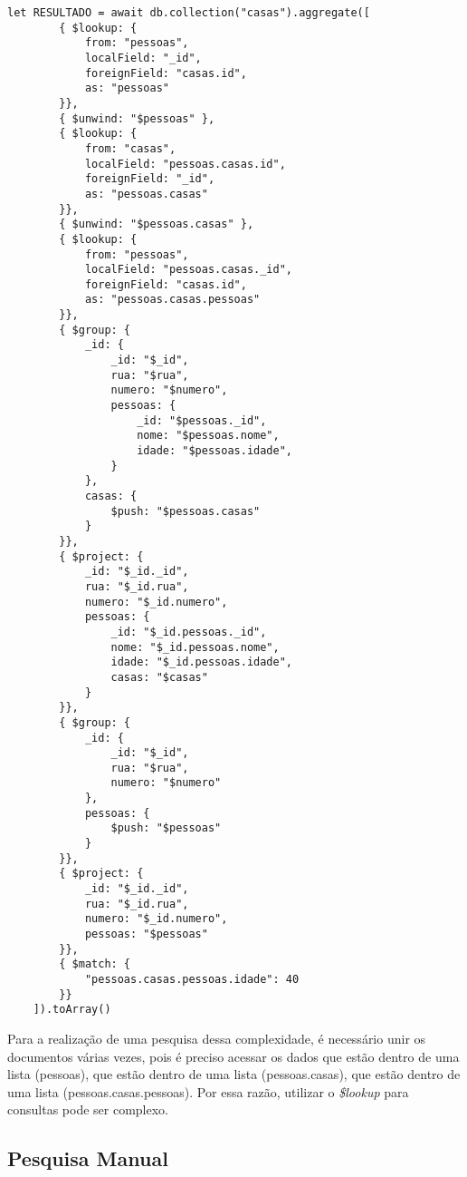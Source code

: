\begin{lstlisting}[style=ES6, caption={Busca em Dados Normalizados Com o \textit{\$lookup}\label{lst: busca-lookup-match}}]
    let RESULTADO = await db.collection("casas").aggregate([
        { $lookup: {
            from: "pessoas",
            localField: "_id",
            foreignField: "casas.id",
            as: "pessoas"
        }},
        { $unwind: "$pessoas" },
        { $lookup: {
            from: "casas",
            localField: "pessoas.casas.id",
            foreignField: "_id",
            as: "pessoas.casas"
        }},
        { $unwind: "$pessoas.casas" },
        { $lookup: {
            from: "pessoas",
            localField: "pessoas.casas._id",
            foreignField: "casas.id",
            as: "pessoas.casas.pessoas"
        }},
        { $group: {
            _id: {
                _id: "$_id",
                rua: "$rua",
                numero: "$numero",
                pessoas: {
                    _id: "$pessoas._id",
                    nome: "$pessoas.nome",
                    idade: "$pessoas.idade",
                }
            },
            casas: {
                $push: "$pessoas.casas"
            }
        }},
        { $project: {
            _id: "$_id._id",
            rua: "$_id.rua",
            numero: "$_id.numero",
            pessoas: {
                _id: "$_id.pessoas._id",
                nome: "$_id.pessoas.nome",
                idade: "$_id.pessoas.idade",
                casas: "$casas"
            }
        }},
        { $group: {
            _id: {
                _id: "$_id",
                rua: "$rua",
                numero: "$numero"
            },
            pessoas: {
                $push: "$pessoas"
            }
        }},
        { $project: {
            _id: "$_id._id",
            rua: "$_id.rua",
            numero: "$_id.numero",
            pessoas: "$pessoas"
        }},
        { $match: {
            "pessoas.casas.pessoas.idade": 40
        }}
    ]).toArray()
\end{lstlisting}

Para a realização de uma pesquisa dessa complexidade, é necessário unir os documentos várias vezes, pois é preciso acessar os dados que estão dentro de uma lista (pessoas), que estão dentro de uma lista (pessoas.casas), que estão dentro de uma lista (pessoas.casas.pessoas). Por essa razão, utilizar o \textit{\$lookup} para consultas pode ser complexo.

\subsection{Pesquisa Manual\label{subsection: pesquisa-manual}}
    
